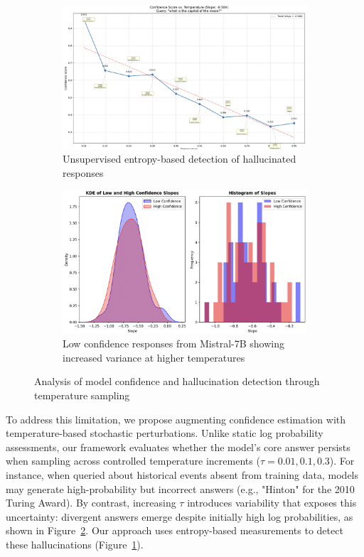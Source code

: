 \documentclass[sigconf]{acmart}
\begin{document}
\begin{figure}[ht]
\centering
\begin{subfigure}{0.48\textwidth}
    \includegraphics[width=\textwidth]{images/unsupervised_entropy.png}
    \caption{Unsupervised entropy-based detection of hallucinated responses}
    \label{fig:entropy}
\end{subfigure}
\hfill
\begin{subfigure}{0.48\textwidth}
    \includegraphics[width=\textwidth]{images/low_conf_mistral.png}
    \caption{Low confidence responses from Mistral-7B showing increased variance at higher temperatures}
    \label{fig:low_conf}
\end{subfigure}
\caption{Analysis of model confidence and hallucination detection through temperature sampling}
\label{fig:confidence_analysis}
\end{figure}


To address this limitation, we propose augmenting confidence estimation with temperature-based stochastic perturbations. Unlike static log probability assessments, our framework evaluates whether the model's core answer persists when sampling across controlled temperature increments ($\tau = 0.01, 0.1, 0.3$). For instance, when queried about historical events absent from training data, models may generate high-probability but incorrect answers (e.g., "Hinton" for the 2010 Turing Award). By contrast, increasing $\tau$ introduces variability that exposes this uncertainty: divergent answers emerge despite initially high log probabilities, as shown in Figure~\ref{fig:low_conf}. Our approach uses entropy-based measurements to detect these hallucinations (Figure~\ref{fig:entropy}).
\end{document}
